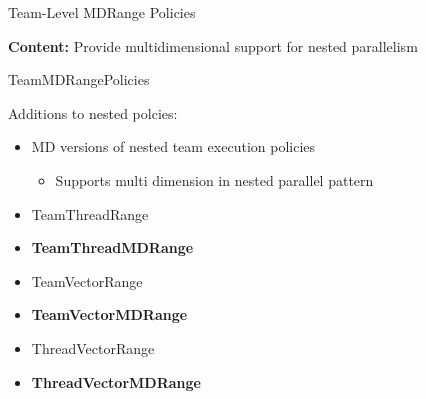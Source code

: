 

\begin{frame}[fragile]

  {\Huge Team-Level MDRange Policies}

  \vspace{10pt}

  \textbf{Content:}
  Provide multidimensional support for nested parallelism

\end{frame}


\begin{frame}[fragile]{TeamMDRangePolicies}

Additions to nested polcies:

\vspace{10pt}

\begin{itemize}
 \item MD versions of nested team execution policies
 \begin{itemize}
  \item Supports multi dimension in nested parallel pattern
 \end{itemize}
\end{itemize}

\vspace{10pt}

\begin{itemize}
 \item TeamThreadRange
 \item \textbf{TeamThreadMDRange}
 \item TeamVectorRange
 \item \textbf{TeamVectorMDRange}
 \item ThreadVectorRange
 \item \textbf{ThreadVectorMDRange}
\end{itemize}

\end{frame}


